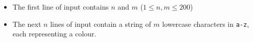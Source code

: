 

\begin{itemize}
  \item The first line of input contains $n$ and $m$ ($1 \le n, m \le 200$)

  \item The next $n$ lines of input contain a string of $m$ lowercase characters in
  \texttt{a-z}, each representing a colour.
\end{itemize}

